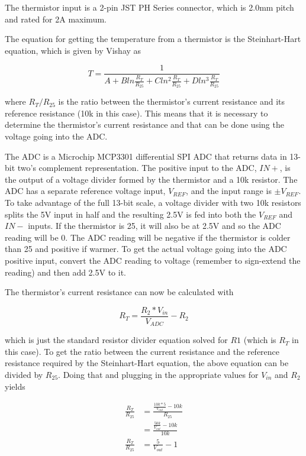 \documentclass{article}
\begin{document}
The thermistor input is a 2-pin JST PH Series connector, which is 2.0mm pitch and rated for 2A maximum.

The equation for getting the temperature from a thermistor is the Steinhart-Hart equation, which is
given by Vishay as

\[
T = \frac{1}{A + Bln\frac{R_T}{R_{25}} + Cln^2\frac{R_T}{R_{25}} + Dln^3\frac{R_T}{R_{25}}}
\]

where $R_T/R_{25}$ is the ratio between the thermistor's current resistance and its reference
resistance (10k\textOmega{} in this case).  This means that it is necessary to determine the
thermistor's current resistance and that can be done using the voltage going into the ADC.

The ADC is a Microchip MCP3301 differential SPI ADC that returns data in 13-bit two's complement
representation.  The positive input to the ADC, $IN+$, is the output of a voltage divider formed by
the thermistor and a 10k\textOmega{} resistor.  The ADC has a separate reference voltage input,
$V_{REF}$, and the input range is $\pm V_{REF}$.  To take advantage of the full 13-bit scale, a
voltage divider with two 10k\textOmega{} resistors splits the 5V input in half and the resulting
2.5V is fed into both the $V_{REF}$ and $IN-$ inputs.  If the thermistor is 25\textcelsius{}, it
will also be at 2.5V and so the ADC reading will be 0.  The ADC reading will be negative if the
thermistor is colder than 25\textcelsius{} and positive if warmer.  To get the actual voltage going
into the ADC positive input, convert the ADC reading to voltage (remember to sign-extend the
reading) and then add 2.5V to it.

The thermistor's current resistance can now be calculated with

\[
R_T = \frac{R_2*V_{in}}{V_{ADC}} - R_2
\]

which is just the standard resistor divider equation solved for $R1$ (which is $R_T$ in this case).
To get the ratio between the current resistance and the reference resistance required by the 
Steinhart-Hart equation, the above equation can be divided by $R_{25}$.  Doing that and plugging in
the appropriate values for $V_{in}$ and $R_2$ yields

\begin{align*}
    \frac{R_T}{R_{25}} &= \frac{\frac{10k * 5}{V_{out}} - 10k}{R_{25}} \\
    &= \frac{\frac{50k}{V_{out}} - 10k}{10k} \\
    \frac{R_T}{R_{25}} &= \frac{5}{V_{out}} - 1
\end{align*}
\end{document}

